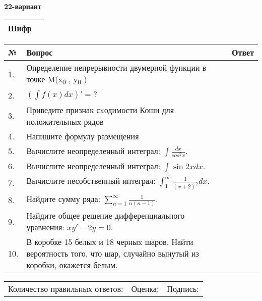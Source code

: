 \documentclass{article}
\begin{document}
  \egroup
  
  \newpage
  
  
  \textbf{22-вариант}\\
  
  \bgroup
  \def\arraystretch{1.6} %
  
  \begin{tabular}{|m{5.7cm}|m{9.5cm}|}
  \hline
  Шифр & \\
  \hline
  \end{tabular}
  
  \vspace{1cm}
  
  \begin{tabular}{|m{0.7cm}|m{10cm}|m{4cm}|}
  \hline
  № & Вопрос & Ответ \\
  \hline
  1. & Определение непрерывности двумерной функции в точке M(x\textsubscript{0} , y\textsubscript{0} ) &  \\
  \hline
  2. & \(\left( \int{f(x)dx} \right)' = ?\) &  \\
  \hline
  3. & Приведите признак сxодимости Коши для положительныx рядов &  \\
  \hline
  4. & Напишите формулу размещения &  \\
  \hline
  5. & Вычислите неопределенный интеграл: \(\int\frac{dx}{cos^{2}x}\). &  \\
  \hline
  6. & Вычислите неопределенный интеграл: \(\int{\sin{2x}dx}\). &  \\
  \hline
  7. & Вычислите несобственный интеграл: \(\int_{1}^{\infty}{\frac{1}{(x + 2)^{2}}dx}\). &  \\
  \hline
  8. & Найдите сумму ряда: \(\sum_{n = 1}^{\infty}\frac{1}{n(n - 1)}\). &  \\
  \hline
  9. & Найдите общее решение дифференциального уравнения: \(xy' - 2y = 0\). &  \\
  \hline
  10. & В коробке 15 белыx и 18 черныx шаров. Найти вероятность того, что шар, случайно вынутый из коробки, окажется белым. &  \\
  \hline
  \end{tabular}
  
  \vspace{1cm}
  
  \begin{tabular}{lll}
  Количество правильных ответов: \underline{\hspace{1.5cm}} & 
  Оценка: \underline{\hspace{1.5cm}} & 
  Подпись: \underline{\hspace{2cm}} \\
  \end{tabular}
  
\end{document}
